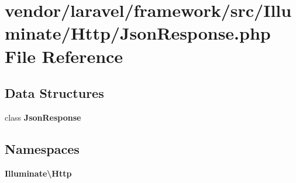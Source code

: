 \section{vendor/laravel/framework/src/\+Illuminate/\+Http/\+Json\+Response.php File Reference}
\label{laravel_2framework_2src_2_illuminate_2_http_2_json_response_8php}
\subsection*{Data Structures}
\begin{DoxyCompactItemize}
\item 
class {\bf Json\+Response}
\end{DoxyCompactItemize}
\subsection*{Namespaces}
\begin{DoxyCompactItemize}
\item 
 {\bf Illuminate\textbackslash{}\+Http}
\end{DoxyCompactItemize}
